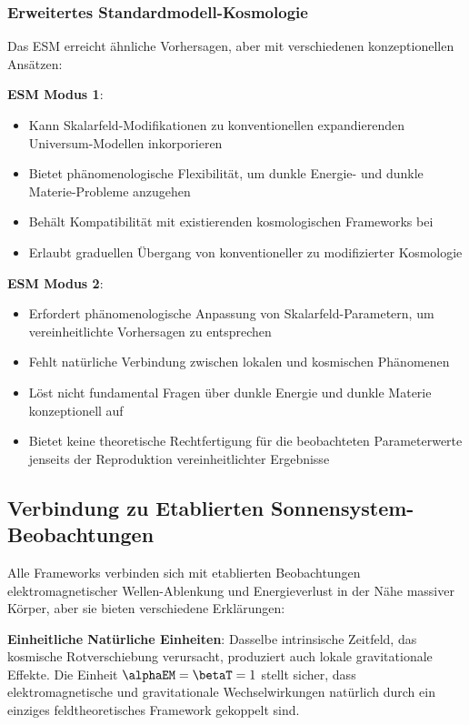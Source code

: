 	\subsubsection{Erweitertes Standardmodell-Kosmologie}
	\label{subsubsec:esm_cosmology}
	
	Das ESM erreicht ähnliche Vorhersagen, aber mit verschiedenen konzeptionellen Ansätzen:
	
	\textbf{ESM Modus 1}:
	\begin{itemize}
		\item Kann Skalarfeld-Modifikationen zu konventionellen expandierenden Universum-Modellen inkorporieren
		\item Bietet phänomenologische Flexibilität, um dunkle Energie- und dunkle Materie-Probleme anzugehen
		\item Behält Kompatibilität mit existierenden kosmologischen Frameworks bei
		\item Erlaubt graduellen Übergang von konventioneller zu modifizierter Kosmologie
	\end{itemize}
	
	\textbf{ESM Modus 2}:
	\begin{itemize}
		\item Erfordert phänomenologische Anpassung von Skalarfeld-Parametern, um vereinheitlichte Vorhersagen zu entsprechen
		\item Fehlt natürliche Verbindung zwischen lokalen und kosmischen Phänomenen
		\item Löst nicht fundamental Fragen über dunkle Energie und dunkle Materie konzeptionell auf
		\item Bietet keine theoretische Rechtfertigung für die beobachteten Parameterwerte jenseits der Reproduktion vereinheitlichter Ergebnisse
	\end{itemize}
	
	\subsection{Verbindung zu Etablierten Sonnensystem-Beobachtungen}
	\label{subsec:solar_system_observations}
	
	Alle Frameworks verbinden sich mit etablierten Beobachtungen elektromagnetischer Wellen-Ablenkung und Energieverlust in der Nähe massiver Körper, aber sie bieten verschiedene Erklärungen:
	
	\textbf{Einheitliche Natürliche Einheiten}: Dasselbe intrinsische Zeitfeld, das kosmische Rotverschiebung verursacht, produziert auch lokale gravitationale Effekte. Die Einheit $\alphaEM = \betaT = 1$ stellt sicher, dass elektromagnetische und gravitationale Wechselwirkungen natürlich durch ein einziges feldtheoretisches Framework gekoppelt sind.
	
